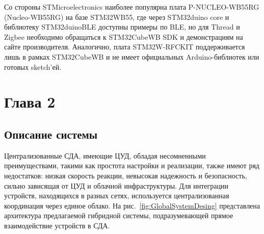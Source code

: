 \documentclass[a4paper,12pt]{article}
\begin{document}
Со стороны STMicroelectronics наиболее популярна плата P-NUCLEO-WB55RG (Nucleo-WB55RG) на базе STM32WB55, где через STM32duino core и библиотеку STM32duinoBLE
доступны примеры по BLE, но для Thread и Zigbee необходимо обращаться к STM32CubeWB SDK и демонстрациям на сайте производителя. Аналогично, плата STM32W-RFCKIT
поддерживается лишь в рамках STM32CubeWB и не имеет официальных Arduino-библиотек или готовых sketch’ей.

\newpage



\section{Глава 2}

\subsection{Описание системы}
Централизованные СДА, имеющие ЦУД, обладая несомненными преимуществами, такими как простота настройки и реализации,
также имеют ряд недостатков: низкая скорость реакции, невысокая надежность и безопасность, сильно зависящая от ЦУД
и облачной инфраструктуры. Для интеграции устройств, находящихся в разных сетях, используется централизованная
координация через единое облако. На рис.~\ref{fig:GlobalSystemDesing} представлена архитектура предлагаемой гибридной системы, подразумевающей
прямое взаимодействие устройств в СДА.
\end{document}
